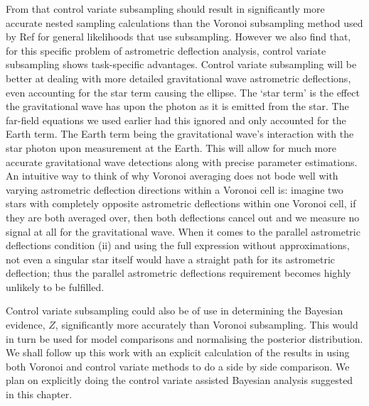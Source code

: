 From  that control variate subsampling should result in significantly more accurate nested sampling calculations than the Voronoi subsampling method used by Ref \cite{Mihaylov_2020} for general likelihoods that use subsampling. However we also find that, for this specific problem of astrometric deflection analysis, control variate subsampling shows task-specific advantages. Control variate subsampling will be better at dealing with more detailed gravitational wave astrometric deflections, even accounting for the star term causing the ellipse. The `star term' is the effect the gravitational wave has upon the photon as it is emitted from the star. The far-field equations we used earlier had this ignored and only accounted for the Earth term. The Earth term being the gravitational wave's interaction with the star photon upon measurement at the Earth. This will allow for much more accurate gravitational wave detections along with precise parameter estimations. An intuitive way to think of why Voronoi averaging does not bode well with varying astrometric deflection directions within a Voronoi cell is: imagine two stars with completely opposite astrometric deflections within one Voronoi cell, if they are both averaged over, then both deflections cancel out and we measure no signal at all for the gravitational wave. When it comes to the parallel astrometric deflections condition (ii) and using the full expression without approximations, not even a singular star itself would have a straight path for its astrometric deflection; thus the parallel astrometric deflections requirement becomes highly unlikely to be fulfilled.

Control variate subsampling could also be of use in determining the Bayesian evidence, $Z$, significantly more accurately than Voronoi subsampling. This would in turn be used for model comparisons and normalising the posterior distribution. We shall follow up this work with an explicit calculation of the results in \cite{Mihaylov_2020} using both Voronoi and control variate methods to do a side by side comparison. We plan on explicitly doing the control variate assisted Bayesian analysis suggested in this chapter. 
